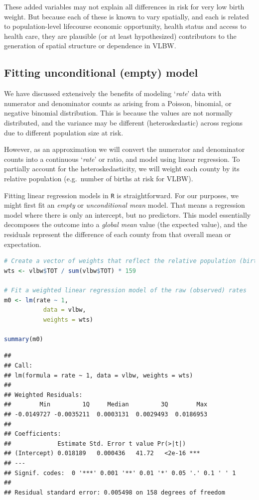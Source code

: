 \documentclass[
]{book}
\newcommand{\passthrough}[1]{#1}
\begin{document}
These added variables may not explain all differences in risk for very low birth weight. But because each of these is known to vary spatially, and each is related to population-level lifecourse economic opportunity, health status and access to health care, they are plausible (or at least hypothesized) contributors to the generation of spatial structure or dependence in VLBW.

\hypertarget{fitting-unconditional-empty-model}{%
\subsection{Fitting unconditional (empty) model}\label{fitting-unconditional-empty-model}}

We have discussed extensively the benefits of modeling `\emph{rate}' data with numerator and denominator counts as arising from a Poisson, binomial, or negative binomial distribution. This is because the values are not normally distributed, and the variance may be different (heteroskedastic) across regions due to different population size at risk.

However, as an approximation we will convert the numerator and denominator counts into a continuous `\emph{rate}' or ratio, and model using linear regression. To partially account for the heteroskedasticity, we will weight each county by its relative population (e.g.~number of births at risk for VLBW).

Fitting linear regression models in \passthrough{\lstinline!R!} is straightforward. For our purposes, we might first fit an \emph{empty} or \emph{unconditional mean} model. That means a regression model where there is only an intercept, but no predictors. This model essentially decomposes the outcome into a \emph{global mean} value (the expected value), and the residuals represent the difference of each county from that overall mean or expectation.

\begin{lstlisting}[language=R]
# Create a vector of weights that reflect the relative population (births) size in each county
wts <- vlbw$TOT / sum(vlbw$TOT) * 159

# Fit a weighted linear regression model of the raw (observed) rates
m0 <- lm(rate ~ 1, 
           data = vlbw,
           weights = wts)

summary(m0)
\end{lstlisting}

\begin{lstlisting}
## 
## Call:
## lm(formula = rate ~ 1, data = vlbw, weights = wts)
## 
## Weighted Residuals:
##        Min         1Q     Median         3Q        Max 
## -0.0149727 -0.0035211  0.0003131  0.0029493  0.0186953 
## 
## Coefficients:
##             Estimate Std. Error t value Pr(>|t|)    
## (Intercept) 0.018189   0.000436   41.72   <2e-16 ***
## ---
## Signif. codes:  0 '***' 0.001 '**' 0.01 '*' 0.05 '.' 0.1 ' ' 1
## 
## Residual standard error: 0.005498 on 158 degrees of freedom
\end{lstlisting}
\end{document}
